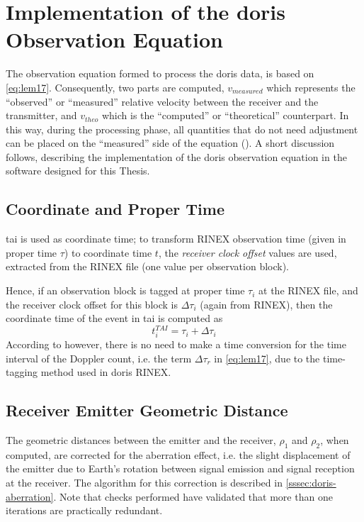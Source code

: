 \section{Implementation of the \gls{doris} Observation Equation}\label{sec:doris-observation-equation-implementation}
The observation equation formed to process the \gls{doris} data, is based on 
\autoref{eq:lem17}. Consequently, two parts are computed, $v_{measured}$ which 
represents the ``observed'' or ``measured'' relative velocity between the receiver 
and the transmitter, and $v_{theo}$ which is the ``computed'' or ``theoretical'' 
counterpart. In this way, during the processing phase, all quantities that do not 
need adjustment can be placed on the ``measured'' side of the equation 
(\cite{Lemoine2016}). A short discussion follows, describing the implementation 
of the \gls{doris} observation equation in the software designed for this Thesis.

\subsection{Coordinate and Proper Time}\label{ssec:coordinate-proper-time}
\gls{tai} is used as coordinate time; to transform RINEX observation time (given in 
proper time $\tau$) to coordinate time $t$, the \emph{receiver clock offset} values 
are used, extracted from the RINEX file (one value per observation block).

Hence, if an observation block is tagged at proper time $\tau _i$ at the RINEX 
file, and the receiver clock offset for this block is $\Delta \tau _i$ (again from 
RINEX), then the coordinate time of the event in \gls{tai} is computed as
\begin{equation}
  t^{TAI}_i = \tau _i + \Delta \tau _i
\end{equation}
According to \cite{Lemoine2016} however, there is no need to make a time conversion 
for the time interval of the Doppler count, i.e. the term $\Delta \tau _r$ in 
\autoref{eq:lem17}, due to the time-tagging method used in \gls{doris} RINEX.

\subsection{Receiver Emitter Geometric Distance}
The geometric distances between the emitter and the receiver, $\rho _1$ and $\rho _2$, 
when computed, are corrected for the aberration effect, i.e. the slight displacement of 
the emitter due to Earth's rotation between signal emission and signal reception at
the receiver. The algorithm for this correction is described in \autoref{sssec:doris-aberration}.
Note that checks performed have validated that more than one iterations are practically 
redundant.

